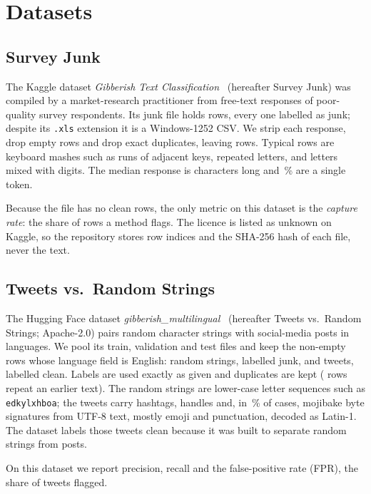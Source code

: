 \documentclass[10pt,twocolumn]{article}
\newcommand{\code}[1]{\texttt{#1}}
\newcommand{\SJ}{Survey Junk}
\newcommand{\TRS}{Tweets vs.\ Random Strings}
\begin{document}
\section{Datasets}
\label{sec:data}

\subsection{\SJ}

The Kaggle dataset \emph{Gibberish Text Classification}~\citep{dataA}
(hereafter \SJ{}) was compiled by a market-research practitioner from free-text responses
of poor-quality survey respondents. Its junk file holds \nArows{} rows,
every one labelled as junk; despite its \code{.xls} extension it is a
Windows-1252 CSV. We strip each response, drop empty rows and drop exact
duplicates, leaving \nA{} rows. Typical rows are keyboard mashes such as
runs of adjacent keys, repeated letters, and letters mixed with digits.
The median response is \Amedianchars{} characters long and
\Asingletokenpct\,\% are a single token.

Because the file has no clean rows, the only metric on this dataset is
the \emph{capture rate}: the share of rows a method flags. The licence is
listed as unknown on Kaggle, so the repository stores row indices and
the SHA-256 hash of each file, never the text.

\subsection{\TRS}

The Hugging Face dataset \emph{gibberish\_multilingual}~\citep{dataB}
(hereafter \TRS{}; Apache-2.0) pairs random character strings with
social-media posts in \nBlanguages{} languages. We pool its train, validation and test files and keep
the \nB{} non-empty rows whose language field is English: \nBpos{}
random strings, labelled junk, and \nBneg{} tweets, labelled clean.
Labels are used exactly as given and duplicates are kept (\nBdup{} rows
repeat an earlier text). The random strings are lower-case letter
sequences such as \code{edkylxhboa}; the tweets carry hashtags, handles
and, in \mojibakepct\,\% of cases, mojibake byte signatures from
UTF-8 text, mostly emoji and punctuation, decoded as Latin-1. The dataset labels those tweets clean
because it was built to separate random strings from posts.

On this dataset we report precision, recall and the false-positive rate
(FPR), the share of tweets flagged.
\end{document}

